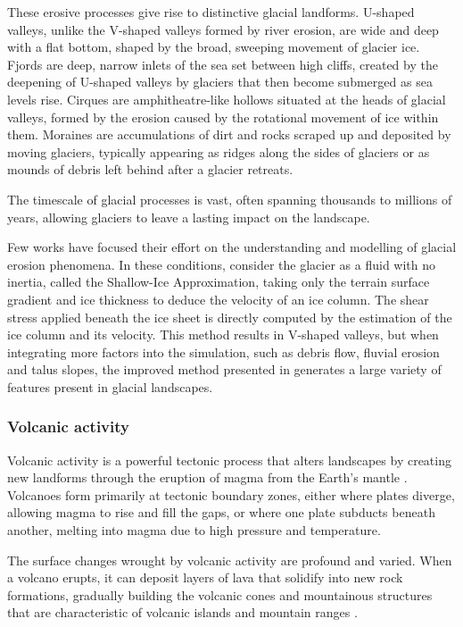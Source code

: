 These erosive processes give rise to distinctive glacial landforms. U-shaped valleys, unlike the V-shaped valleys formed by river erosion, are wide and deep with a flat bottom, shaped by the broad, sweeping movement of glacier ice. Fjords are deep, narrow inlets of the sea set between high cliffs, created by the deepening of U-shaped valleys by glaciers that then become submerged as sea levels rise. Cirques are amphitheatre-like hollows situated at the heads of glacial valleys, formed by the erosion caused by the rotational movement of ice within them. Moraines are accumulations of dirt and rocks scraped up and deposited by moving glaciers, typically appearing as ridges along the sides of glaciers or as mounds of debris left behind after a glacier retreats.

The timescale of glacial processes is vast, often spanning thousands to millions of years, allowing glaciers to leave a lasting impact on the landscape.

Few works have focused their effort on the understanding and modelling of glacial erosion phenomena. In these conditions, \cite{Argudo2020} consider the glacier as a fluid with no inertia, called the Shallow-Ice Approximation, taking only the terrain surface gradient and ice thickness to deduce the velocity of an ice column. The shear stress applied beneath the ice sheet is directly computed by the estimation of the ice column and its velocity. This method results in V-shaped valleys, but when integrating more factors into the simulation, such as debris flow, fluvial erosion and talus slopes, the improved method presented in \cite{Cordonnier2023} generates a large variety of features present in glacial landscapes.

\subsubsection{Volcanic activity}
Volcanic activity is a powerful tectonic process that alters landscapes by creating new landforms through the eruption of magma from the Earth's mantle \cite{Ramalho2013}. Volcanoes form primarily at tectonic boundary zones, either where plates diverge, allowing magma to rise and fill the gaps, or where one plate subducts beneath another, melting into magma due to high pressure and temperature.

The surface changes wrought by volcanic activity are profound and varied. When a volcano erupts, it can deposit layers of lava that solidify into new rock formations, gradually building the volcanic cones and mountainous structures that are characteristic of volcanic islands and mountain ranges \cite{Woodroffe2003}.

